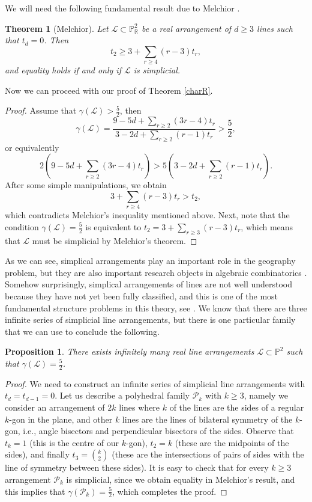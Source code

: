 \documentclass{article}
\theoremstyle{plain}
\newtheorem{theorem}[thm]{Theorem}
\newtheorem{proposition}[thm]{Proposition}
\theoremstyle{definition}
\numberwithin{equation}{section}
\begin{document}
We will need the following fundamental result due to Melchior \cite{Melchior}.
\begin{theorem}[Melchior]
Let $\mathcal{L} \subset \mathbb{P}^{2}_{\mathbb{R}}$ be a real arrangement of $d\geq 3$ lines such that $t_{d}=0$. Then
\[t_{2} \geq 3 + \sum_{r\geq 4}(r-3)t_{r},\]
and equality holds if and only if $\mathcal{L}$ is simplicial.
\end{theorem}
Now we can proceed with our proof of Theorem \ref{charR}.
\begin{proof}
Assume that $\gamma(\mathcal{L})>\frac{5}{2}$, then
\[\gamma(\mathcal{L})=\dfrac{9-5d+\sum_{r\geq 2}(3r-4)t_{r}}{3-2d+\sum_{r\geq 2}(r-1)t_{r}}>\dfrac{5}{2},
\]
or equivalently
\[2(9-5d+\sum_{r\geq 2}(3r-4)t_{r})>5(3-2d+\sum_{r\geq 2}(r-1)t_{r}).\]
After some simple manipulations, we obtain
\[3+ \sum_{r\geq 4}(r-3)t_{r}>t_{2},\]
which contradicts Melchior's inequality mentioned above. Next, note that the condition $\gamma(\mathcal{L}) = \frac{5}{2}$ is equivalent to $t_{2} = 3 + \sum_{r\geq 3}(r-3)t_{r}$, which means that $\mathcal{L}$ must be simplicial by Melchior's theorem.
\end{proof}
As we can see, simplical arrangements play an important role in the geography problem, but they are also important research objects in algebraic combinatorics \cite{Grunbaum}. Somehow surprisingly, simplical arrangements of lines are not well understood because they have not yet been fully classified, and this is one of the most fundamental structure problems in this theory, see \cite{Cuntz}. We know that there are three infinite series of simplicial line arrangements, but there is one particular family that we can use to conclude the following.
\begin{proposition}
There exists infinitely many real line arrangements $\mathcal{L}\subset \mathbb{P}^{2}$ such that $\gamma(\mathcal{L}) = \frac{5}{2}$.  
\end{proposition}
\begin{proof}
We need to construct an infinite series of simplicial line arrangements with $t_{d}=t_{d-1}=0$. Let us describe a polyhedral family $\mathcal{P}_{k}$ with $k\geq 3$, namely we consider an arrangement of $2k$ lines where $k$ of the lines are the sides of a regular $k$-gon in the plane, and other $k$ lines are the lines of bilateral symmetry of the $k$-gon, i.e., angle bisectors and perpendicular bisectors of the sides. Observe that $t_{k}=1$ (this is the centre of our $k$-gon), $t_{2}=k$ (these are the midpoints of the sides), and finally $t_{3} = \binom{k}{2}$ (these are the intersections of pairs of sides with the line of symmetry between these sides). It is easy to check that for every $k\geq 3$ arrangement $\mathcal{P}_{k}$ is simplicial, since we obtain equality in Melchior's result, and this implies that $\gamma(\mathcal{P}_{k})=\frac{5}{2}$, which completes the proof.
\end{proof}
\end{document}
